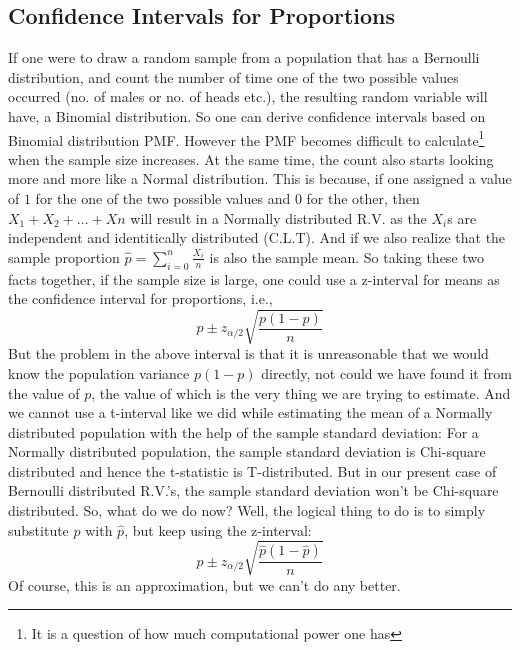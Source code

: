\subsection{Confidence Intervals for Proportions}
If one were to draw a random sample from a population that has a Bernoulli distribution, and count the number of time one of the two possible values occurred (no. of males or no. of heads etc.), the resulting random variable will have, a Binomial distribution. So one can derive confidence intervals based on Binomial distribution PMF. However the PMF becomes difficult to calculate\footnote{It is a question of how much computational power one has} when the sample size increases. At the same time, the count also starts looking more and more like a Normal distribution. This is because, if one assigned a value of $1$ for the one of the two possible values and $0$ for the other, then \( X_1+X_2+...+Xn \) will result in a Normally distributed R.V. as the $X_i$s are independent and identitically distributed (C.L.T). And if we also realize that the sample proportion $ \hat{p} = \sum_{i=0}^{n}\frac{ X_i}{n} $ is also the sample mean. So taking these two facts together, if the sample size is large, one could use a z-interval for means as the confidence interval for proportions, i.e., 
	\[ \hat{p}\pm z_{\alpha/2}\sqrt{\dfrac{p(1-p)}{n}} \]
But the problem in the above interval is that it is unreasonable that we would know the population variance $ p(1-p) $ directly, not could we have found it from the value of $p$, the value of which is the very thing we are trying to estimate. And we cannot use a t-interval like we did while estimating the mean of a Normally distributed population with the help of the sample standard deviation: For a Normally distributed population, the sample standard deviation is Chi-square distributed and hence the t-statistic is T-distributed. But in our present case of Bernoulli distributed R.V.'s, the sample standard deviation won't be Chi-square distributed. So, what do we do now? Well, the logical thing to do is to simply substitute $p$ with $\hat{p}$, but keep using the z-interval: 
	\[ \hat{p}\pm z_{\alpha/2}\sqrt{\dfrac{\hat{p}(1-\hat{p})}{n}} \]
Of course, this is an approximation, but we can't do any better.

